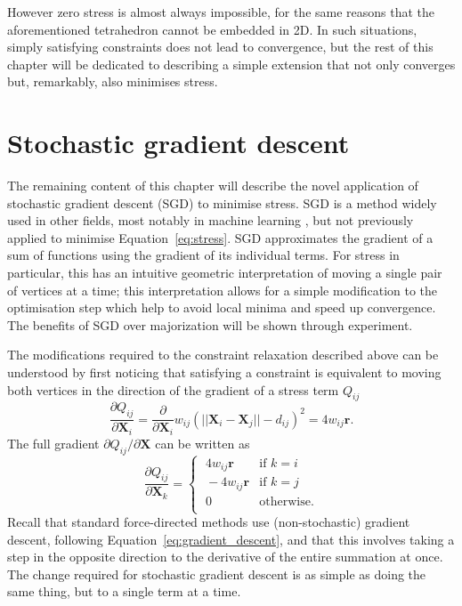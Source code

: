 However zero stress is almost always impossible, for the same reasons that the aforementioned tetrahedron cannot be embedded in 2D. In such situations, simply satisfying constraints does not lead to convergence, but the rest of this chapter will be dedicated to describing a simple extension that not only converges but, remarkably, also minimises stress.

\newpage
\section{Stochastic gradient descent}
\label{sec:sgd}
The remaining content of this chapter will describe the novel application of stochastic gradient descent (SGD) to minimise stress. SGD is a method widely used in other fields, most notably in machine learning \citep{Bottou2012}, but not previously applied to minimise Equation~\ref{eq:stress}. 
SGD approximates the gradient of a sum of functions using the gradient of its individual terms. For stress in particular, this has an intuitive geometric interpretation of moving a single pair of vertices at a time; this interpretation allows for a simple modification to the optimisation step which help to avoid local minima and speed up convergence. The benefits of SGD over majorization will be shown through experiment.

The modifications required to the constraint relaxation described above can be understood by first noticing that satisfying a constraint is equivalent to moving both vertices in the direction of the gradient of a stress term $Q_{ij}$
\begin{equation}
  \label{gradient}
  \frac{\partial Q_{ij}}{\partial\mathbf{X}_i}=\frac{\partial}{\partial\mathbf{X}_i}w_{ij}(||\mathbf{X}_i - \mathbf{X}_j|| - d_{ij})^2 = 4w_{ij}\mathbf{r}.
\end{equation}
The full gradient $\partial Q_{ij}/\partial\mathbf{X}$ can be written as
\begin{equation}
  \frac{\partial Q_{ij}}{\partial\mathbf{X}_k}=
  \begin{cases}
    \;4w_{ij}\mathbf{r} & \mbox{if $k=i$} \\
    \;-4w_{ij}\mathbf{r} & \mbox{if $k=j$} \\
    \;0 & \mbox{otherwise.} \\
  \end{cases}
\end{equation}
Recall that standard force-directed methods use (non-stochastic) gradient descent, following Equation~\eqref{eq:gradient_descent}, and that this involves taking a step in the opposite direction to the derivative of the entire summation at once.
The change required for stochastic gradient descent is as simple as doing the same thing, but to a single term at a time.

